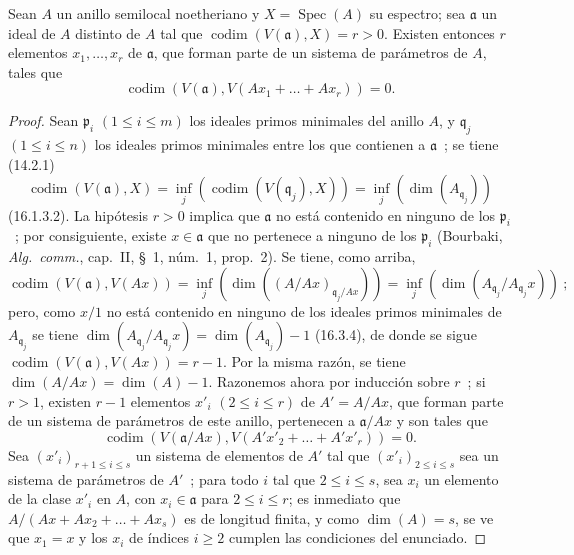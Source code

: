 
\begin{proposition}[16.3.8]
\label{0.16.3.8-es}
Sean $A$ un anillo semilocal noetheriano y $X=\operatorname{Spec}(A)$ su
espectro; sea $\mathfrak{a}$ un ideal de $A$ distinto de $A$ tal que
$\operatorname{codim}(V(\mathfrak{a}),X)=r>0$. Existen entonces $r$ elementos
$x_1,\ldots,x_r$ de $\mathfrak{a}$, que forman parte de un sistema de parámetros
de $A$, tales que
\[
  \operatorname{codim}(V(\mathfrak{a}),
  V(Ax_1+\ldots+Ax_r))=0.
\]
\end{proposition}

\begin{proof}
Sean $\mathfrak{p}_i$ $(1\leq i\leq m)$ los ideales primos minimales del
anillo $A$, y $\mathfrak{q}_j$ $(1\leq i\leq n)$ los ideales primos minimales
entre los que contienen a $\mathfrak{a}$~; se tiene (14.2.1)
\[
  \operatorname{codim}(V(\mathfrak{a}),X)
  =\inf_j(\operatorname{codim}(V(\mathfrak{q}_j),X))
  =\inf_j(\dim(A_{\mathfrak{q}_j}))
\]
(16.1.3.2). La hipótesis $r>0$ implica que $\mathfrak{a}$ no está contenido en
ninguno de los $\mathfrak{p}_i$~; por consiguiente, existe
$x\in\mathfrak{a}$ que no pertenece a ninguno de los $\mathfrak{p}_i$
(Bourbaki, \emph{Alg.~comm.}, cap.~II, \S~1, núm.~1, prop.~2). Se tiene, como
arriba,
\[
  \operatorname{codim}(V(\mathfrak{a}),V(Ax))
  =\inf_j(\dim((A/Ax)_{\mathfrak{q}_j/Ax}))
  =\inf_j(\dim(A_{\mathfrak{q}_j}/A_{\mathfrak{q}_j}x))~;
\]
pero, como $x/1$ no está contenido en ninguno de los ideales primos minimales
de $A_{\mathfrak{q}_j}$ se tiene
$\dim(A_{\mathfrak{q}_j}/A_{\mathfrak{q}_j}x)
=\dim(A_{\mathfrak{q}_j})-1$ (16.3.4), de donde se sigue
$\operatorname{codim}(V(\mathfrak{a}),V(Ax))=r-1$. Por la misma razón, se tiene
$\dim(A/Ax)=\dim(A)-1$. Razonemos ahora por inducción sobre $r$~; si
$r>1$, existen $r-1$ elementos $x'_i$ $(2\leq i\leq r)$ de $A'=A/Ax$,
que forman parte de un sistema de parámetros de este anillo, pertenecen a
$\mathfrak{a}/Ax$ y son tales que
\[
  \operatorname{codim}(V(\mathfrak{a}/Ax),
  V(A'x'_2+\ldots+A'x'_r))=0.
\]
Sea $(x'_i)_{r+1\leq i\leq s}$ un sistema de elementos de $A'$ tal que
$(x'_i)_{2\leq i\leq s}$ sea un sistema de parámetros de $A'$~; para todo
$i$ tal que $2\leq i\leq s$, sea $x_i$ un elemento de la clase $x'_i$ en
$A$, con $x_i\in\mathfrak{a}$ para $2\leq i\leq r$; es inmediato que
$A/(Ax+Ax_2+\ldots+Ax_s)$ es de longitud finita, y como $\dim(A)=s$, se ve
que $x_1=x$ y los $x_i$ de índices $i\geq2$ cumplen las condiciones del
enunciado.
\end{proof}

